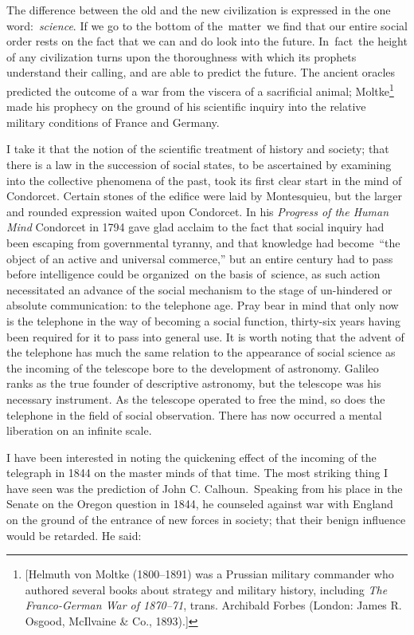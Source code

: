 \documentclass[twoside,symmetric,nobib,justified]{tufte-book}
\begin{document}
The difference between the old and the new civilization is expressed in
the one word:~\emph{science}. If we go to the bottom of the~matter~we
find that our entire social order rests on the fact that we can and do
look into the future. In~fact~the height of any civilization turns upon
the thoroughness with which its prophets understand their calling, and
are able to predict the future. The ancient oracles predicted the
outcome of a war from the viscera of a sacrificial animal;
Moltke\footnote{{[}Helmuth von Moltke (1800--1891) was a Prussian
  military commander who authored several books about strategy and
  military history, including \emph{The Franco-German War of 1870--71},
  trans. Archibald Forbes \emph{} (London: James R. Osgood, McIlvaine \&
  Co., 1893).{]}} made his prophecy on the ground of his scientific
inquiry into the relative military conditions of France and Germany.~

I take it that the notion of the scientific treatment of history and
society; that there is a law in the succession of social states, to be
ascertained by examining into the collective phenomena of the past, took
its first clear start in the mind of Condorcet. Certain stones of the
edifice were laid by Montesquieu, but the larger and rounded expression
waited upon Condorcet. In his \emph{Progress of the Human Mind}
Condorcet in 1794 gave glad acclaim to the fact that social inquiry had
been escaping from governmental tyranny, and that knowledge had
become~``the object of an active and universal commerce,'' but an entire
century had to pass before intelligence could be organized~on the basis
of~science, as such action necessitated an advance of the social
mechanism to the stage of un-hindered or absolute communication: to the
telephone age. Pray bear in mind that only now is the telephone in the
way of becoming a social function, thirty-six years having been required
for it to pass into general use. It is worth noting that the advent of
the telephone has much the same relation to the appearance of social
science as the incoming of the telescope bore to the development of
astronomy. Galileo ranks as the true founder of descriptive astronomy,
but the telescope was his necessary instrument. As the telescope
operated to free the mind, so does the telephone in the field of social
observation. There has now occurred a mental liberation on an infinite
scale.~

I have been interested in noting the quickening effect of the incoming
of the telegraph in 1844 on the master minds of that time. The most
striking thing I have seen was the prediction of John C.
Calhoun.~Speaking from his place in the Senate on the Oregon question in
1844, he counseled against war with England on the ground of the
entrance of new forces in society; that their benign influence would be
retarded. He said:~
\end{document}
